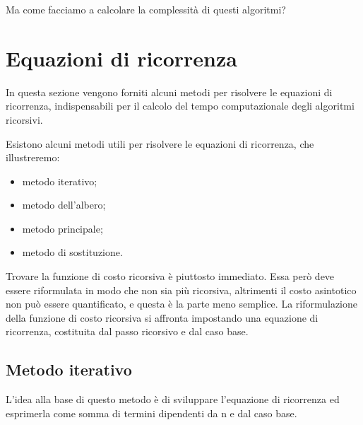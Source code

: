 Ma come facciamo a calcolare la complessità di questi algoritmi?

\section{Equazioni di ricorrenza}
In questa sezione vengono forniti alcuni metodi per risolvere le equazioni di ricorrenza, indispensabili per il calcolo del tempo computazionale degli algoritmi ricorsivi.

Esistono alcuni metodi utili per risolvere le equazioni di ricorrenza, che illustreremo:
\begin{itemize}
    \item metodo iterativo;
    \item metodo dell'albero;
    \item metodo principale;
    \item metodo di sostituzione.
\end{itemize}

Trovare la funzione di costo ricorsiva è piuttosto immediato. Essa però deve essere riformulata in modo che non sia più ricorsiva, altrimenti il costo asintotico non può essere quantificato, e questa è la parte meno semplice. La riformulazione della funzione di costo ricorsiva si affronta impostando una equazione di ricorrenza, costituita dal passo ricorsivo e dal caso base.


\subsection*{Metodo iterativo}
L’idea alla base di questo metodo è di sviluppare l’equazione di ricorrenza ed esprimerla come somma di termini dipendenti da n e dal caso base.

